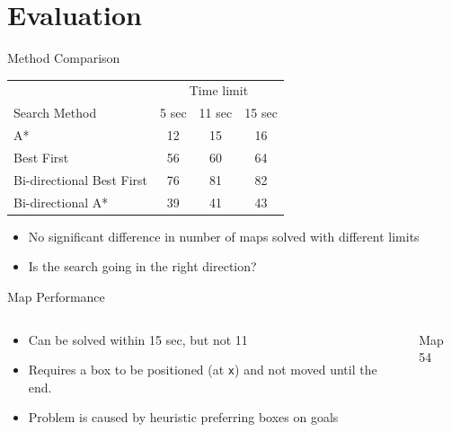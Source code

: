 \documentclass{beamer}
\begin{document}
\section{Evaluation}

\begin{frame}{Method Comparison}
  \begin{table}
    \centering
    \begin{tabular}{lccc}
      & \multicolumn{3}{c}{Time limit}\\
      \cline{2-4}
      Search Method              &  5 sec  &  11 sec  &  15 sec  \\
      \hline
      A*                         &     12  &      15  &      16  \\
      Best First                 &     56  &      60  &      64  \\
      Bi-directional Best First  &     76  &      81  &      82  \\
      Bi-directional A*          &     39  &      41  &      43  \\
    \end{tabular}
  \end{table}
  \begin{itemize}
  \item No significant difference in number of maps solved with different limits
  \item Is the search going in the right direction?
  \end{itemize}
\end{frame}

\begin{frame}{Map Performance}
  \begin{columns}
    \begin{column}{.5\textwidth}
       \begin{itemize}
       \item Can be solved within 15 sec, but not 11
       \item Requires a box to be positioned (at \texttt{x}) and not moved until the end.
       \item Problem is caused by heuristic preferring boxes on goals
       \end{itemize}
    \end{column}
    \begin{column}{.5\textwidth}
    \begin{block}{Map 54}
      \centering
      \usebox{\mapff}
    \end{block}
    \end{column}
  \end{columns}
\end{frame}
\end{document}
